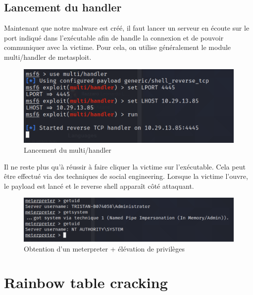 \documentclass[12pt, oneside]{article}
\begin{document}
\subsection{Lancement du handler}
Maintenant que notre malware est créé, il faut lancer un serveur en écoute sur le port indiqué dans l'exécutable afin de handle la connexion et de pouvoir communiquer avec la victime. Pour cela, on utilise généralement le module multi/handler de metasploit.
\begin{figure}[H]
\centering
\includegraphics[scale=0.4]{handler}
\caption{Lancement du multi/handler}
\end{figure}
Il ne reste plus qu'à réussir à faire cliquer la victime sur l'exécutable. Cela peut être effectué via des techniques de social engineering. Lorsque la victime l'ouvre, le payload est lancé et le reverse shell apparaît côté attaquant.
\begin{figure}[H]
\centering
\includegraphics[scale=0.4]{system}
\caption{Obtention d'un meterpreter + élévation de privilèges}
\end{figure}
\section{Rainbow table cracking}
\end{document}

